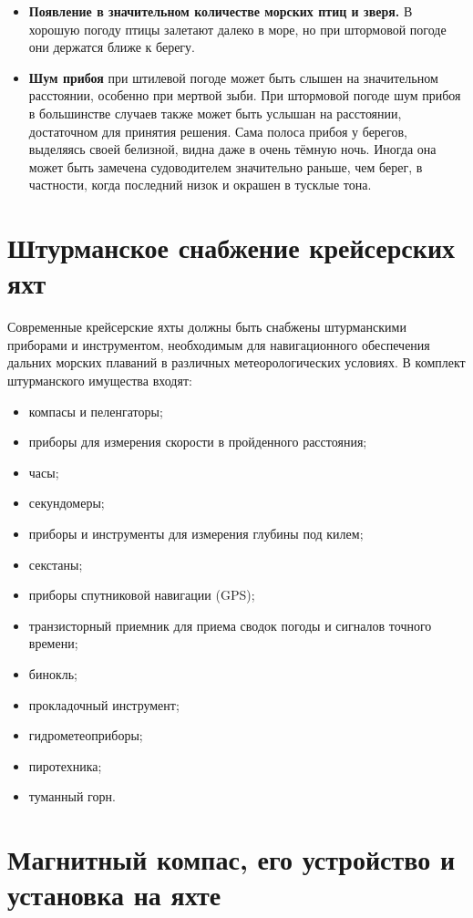 \begin{itemize}
\item \textbf{Появление в значительном количестве морских птиц и зверя.} В хорошую погоду птицы залетают далеко в море, но при штормовой погоде они держатся ближе к берегу. 
\item \textbf{Шум прибоя} при штилевой погоде может быть слышен на значительном расстоянии, особенно при мертвой зыби. При штормовой погоде шум прибоя в большинстве случаев также может быть услышан на расстоянии, достаточном для принятия решения. Сама полоса прибоя у берегов, выделяясь своей белизной, видна даже в очень тёмную ночь. Иногда она может быть замечена судоводителем значительно раньше, чем берег, в частности, когда последний низок и окрашен в тусклые тона. 
\end{itemize}

\section{Штурманское снабжение крейсерских яхт}

Современные крейсерские яхты должны быть снабжены штурманскими приборами и инструментом, необходимым для навигационного обеспечения дальних морских плаваний в различных метеорологических условиях. В комплект штурманского имущества входят: 

\begin{itemize}
\item компасы и пеленгаторы; 
\item приборы для измерения скорости в пройденного расстояния; 
\item часы; 
\item секундомеры; 
\item приборы и инструменты для измерения глубины под килем; 
\item секстаны; 
\item приборы спутниковой навигации (GPS); 
\item транзисторный приемник для приема сводок погоды и сигналов точного времени; 
\item бинокль; 
\item прокладочный инструмент; 
\item гидрометеоприборы; 
\item пиротехника; 
\item туманный горн. 
\end{itemize}

\section{Магнитный компас, его устройство и установка на яхте}

